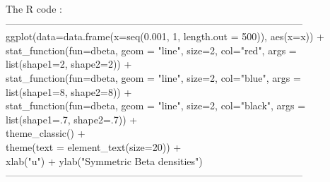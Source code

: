\documentclass{book} %
\begin{document}
\noindent The R code :\\
------------------------------------------------------------------------------------------\\
ggplot(data=data.frame(x=seq(0.001, 1, length.out = 500)), aes(x=x)) +\\
stat\_function(fun=dbeta, geom = "line", size=2, col="red", args = list(shape1=2, shape2=2)) +\\
stat\_function(fun=dbeta, geom = "line", size=2, col="blue", args = list(shape1=8, shape2=8)) +\\
stat\_function(fun=dbeta, geom = "line", size=2, col="black", args = list(shape1=.7, shape2=.7)) +\\
theme\_classic() +\\
theme(text = element\_text(size=20)) +\\
xlab("u") + ylab("Symmetric Beta densities")\\
------------------------------------------------------------------------------------------\\
\end{document}

